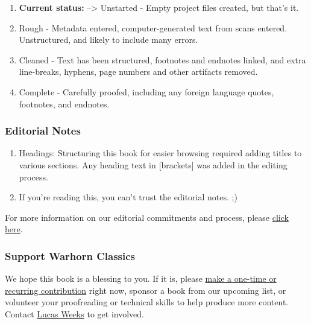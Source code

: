 \documentclass[
]{book}
\providecommand{\tightlist}{%
  \setlength{\itemsep}{0pt}\setlength{\parskip}{0pt}}
\begin{document}
\begin{enumerate}
\def\labelenumi{\arabic{enumi}.}
\setcounter{enumi}{-1}
\tightlist
\item
  \textbf{Current status:} --\textgreater{} Unstarted - Empty project files created, but that's it.
\item
  Rough - Metadata entered, computer-generated text from scans entered. Unstructured, and likely to include many errors.
\item
  Cleaned - Text has been structured, footnotes and endnotes linked, and extra line-breaks, hyphens, page numbers and other artifacts removed.
\item
  Complete - Carefully proofed, including any foreign language quotes, footnotes, and endnotes.
\end{enumerate}

\hypertarget{editorial-notes}{%
\subsubsection*{Editorial Notes}\label{editorial-notes}}

\begin{enumerate}
\def\labelenumi{\arabic{enumi}.}
\tightlist
\item
  Headings: Structuring this book for easier browsing required adding titles to various sections. Any heading text in {[}brackets{]} was added in the editing process.
\item
  If you're reading this, you can't trust the editorial notes. ;)
\end{enumerate}

For more information on our editorial commitments and process, please \href{https://classics.warhornmedia.com/editorial}{click here}.

\hypertarget{support-warhorn-classics}{%
\subsubsection*{Support Warhorn Classics}\label{support-warhorn-classics}}

We hope this book is a blessing to you. If it is, please \href{https://warhornmedia.com/give}{make a one-time or recurring contribution} right now, sponsor a book from our upcoming list, or volunteer your proofreading or technical skills to help produce more content. Contact \href{mailto:lucas@beggarsborn.com}{Lucas Weeks} to get involved.
\end{document}
